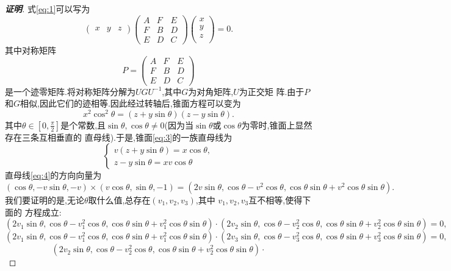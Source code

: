 \documentclass[a4paper]{article}
\begin{document}
\begin{proof}[\textbf{证明}]
式\eqref{eq:1}可以写为
\begin{equation}
  \label{eq:2}
  \begin{pmatrix}
    x&y&z
  \end{pmatrix}
  \begin{pmatrix}
    A&F&E\\
    F&B&D\\
    E&D&C
  \end{pmatrix}
  \begin{pmatrix}
    x\\
    y\\
    z\\
  \end{pmatrix}=0.
\end{equation}
其中对称矩阵
$$
P= \begin{pmatrix}
  A&F&E\\
  F&B&D\\
  E&D&C
\end{pmatrix}
$$
是一个迹零矩阵.将对称矩阵分解为$UGU^{-1}$,其中$G$为对角矩阵,$U$为正交矩
阵.由于$P$和$G$相似,因此它们的迹相等.因此经过转轴后,锥面方程可以变为
\begin{equation}\label{eq:3}
  x^2\cos^2\theta=(z+y\sin\theta)(z-y\sin\theta).
\end{equation}
其中$\theta\in [0,\frac{\pi}{2}]$是个常数,且$\sin\theta,\cos\theta\neq
0$(因为当$\sin\theta$或$\cos\theta$为零时,锥面上显然存在三条互相垂直的
直母线).于是,锥面\eqref{eq:3}的一族直母线为
\begin{equation}\label{eq:4}
  \begin{cases}
    v(z+y\sin\theta)=x\cos\theta,\\
    z-y\sin\theta=xv\cos\theta
  \end{cases}
\end{equation}
直母线\eqref{eq:4}的方向向量为
$$
(\cos\theta,-v\sin\theta,-v)\times
(v\cos\theta,\sin\theta,-1)=(2v\sin\theta,\cos\theta-v^2\cos\theta,\cos\theta\sin\theta+v^2\cos\theta\sin\theta).
$$
我们要证明的是,无论$\theta$取什么值,总存在$(v_1,v_2,v_{3})$,其中
$v_1,v_2,v_3$互不相等,使得下面的
方程成立:
$$
(2v_{1}\sin\theta,\cos\theta-v_{1}^2\cos\theta,\cos\theta\sin\theta+v_{1}^2\cos\theta\sin\theta)\cdot
(2v_{2}\sin\theta,\cos\theta-v_{2}^2\cos\theta,\cos\theta\sin\theta+v_{2}^2\cos\theta\sin\theta)=0,
$$
$$
(2v_{1}\sin\theta,\cos\theta-v_{1}^2\cos\theta,\cos\theta\sin\theta+v_{1}^2\cos\theta\sin\theta)\cdot
(2v_{3}\sin\theta,\cos\theta-v_{3}^2\cos\theta,\cos\theta\sin\theta+v_{3}^2\cos\theta\sin\theta)=0,
$$
$$
(2v_{2}\sin\theta,\cos\theta-v_{2}^2\cos\theta,\cos\theta\sin\theta+v_{2}^2\cos\theta\sin\theta)\cdot
$$
\end{proof}
\end{document}
